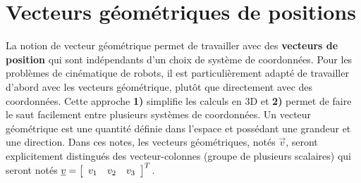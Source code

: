 %

  



\newpage
\section{Vecteurs géométriques de positions}
\label{sec:vecgeopos}

La notion de vecteur géométrique permet de travailler avec des \textbf{vecteurs de position} qui sont indépendants d'un choix de système de coordonnées. Pour les problèmes de cinématique de robots, il est particulièrement adapté de travailler d'abord avec les vecteurs géométrique, plutôt que directement avec des coordonnées. Cette approche \textbf{1)} simplifie les calculs en 3D et \textbf{2)} permet de faire le saut facilement entre plusieurs systèmes de coordonnées. Un vecteur géométrique est une quantité définie dans l’espace et possédant une grandeur et une direction. Dans ces notes, les vecteurs géométriques, notés $\vec{v}$, seront explicitement distingués des vecteur-colonnes (groupe de plusieurs scalaires) qui seront notés $\underline{v}=\left[  \begin{array}{ccc} v_{1} & v_{2} & v_{3} \end{array} \right]^T$. 



